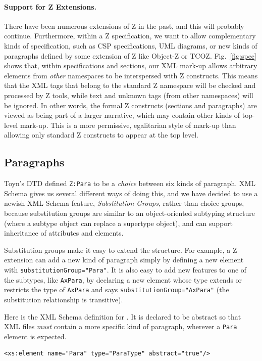 \documentclass{llncs}  %
\begin{document}
\paragraph{Support for Z Extensions.}
There have been numerous extensions of Z in the past, and this will
probably continue.  Furthermore, within a Z specification, we want
to allow complementary kinds of specification, such as CSP specifications,
UML diagrams, or new kinds of paragraphs defined by some extension of Z
like Object-Z or TCOZ.  
Fig.~\ref{fig:spec} shows that, within specifications and sections, our XML
mark-up allows arbitrary elements from \emph{other} namespaces to be
interspersed with Z constructs.  
This means that the XML tags that belong to the standard Z
namespace will be checked and processed by Z tools, while text and unknown
tags (from other namespaces) will be ignored.  In other words, the formal Z
constructs (sections and paragraphs) are viewed as being part of a
larger narrative, which may contain other kinds of 
top-level mark-up.  This is a more permissive, egalitarian style of
mark-up than allowing only standard Z constructs to appear at the top
level.


\subsection{Paragraphs}

Toyn's DTD defined \verb!Z:Para! to be a \emph{choice} between six
kinds of paragraph.  XML Schema gives us several different ways of doing
this, and we have decided to use a newish XML Schema feature,
\emph{Substitution Groups}, rather than choice groups, because substitution
groups are similar to an object-oriented subtyping structure (where a
subtype object can replace a supertype object), and can support inheritance
of attributes and elements.   

Substitution groups make it easy to extend the structure.  For example, a Z
extension can add a new kind of paragraph simply by defining a new
element with \texttt{substitutionGroup="Para"}.  It is also easy to add new
features to one of the subtypes, like \texttt{AxPara}, by declaring a new
element whose type extends or restricts the type of \texttt{AxPara} and
says \texttt{substitutionGroup="AxPara"} (the substitution relationship is
transitive).

Here is the XML Schema definition for .
It is declared to be abstract so that XML files \emph{must} contain a
more specific kind of paragraph, wherever a \texttt{Para} element is 
expected.
\begin{verbatim}
<xs:element name="Para" type="ParaType" abstract="true"/>
\end{verbatim}
\end{document}
